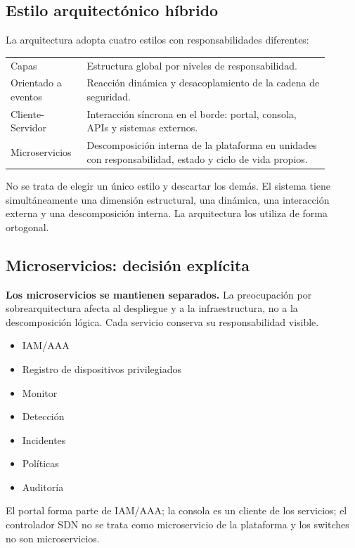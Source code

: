 \documentclass[11pt,a4paper]{article}
\begin{document}
\subsection{Estilo arquitectónico híbrido}

La arquitectura adopta cuatro estilos con responsabilidades diferentes:

\begin{longtable}{p{0.2\linewidth}p{0.7\linewidth}}
\toprule
Capas & Estructura global por niveles de responsabilidad.\\
Orientado a eventos & Reacción dinámica y desacoplamiento de la cadena de seguridad.\\
Cliente-Servidor & Interacción síncrona en el borde: portal, consola, APIs y sistemas externos.\\
Microservicios & Descomposición interna de la plataforma en unidades con responsabilidad, estado y ciclo de vida propios.\\
\bottomrule
\end{longtable}

No se trata de elegir un único estilo y descartar los demás. El sistema tiene simultáneamente una dimensión estructural, una dinámica, una interacción externa y una descomposición interna. La arquitectura los utiliza de forma ortogonal.

\subsection{Microservicios: decisión explícita}

\textbf{Los microservicios se mantienen separados.} La preocupación por sobrearquitectura afecta al despliegue y a la infraestructura, no a la descomposición lógica. Cada servicio conserva su responsabilidad visible.

\begin{itemize}
\item IAM/AAA
\item Registro de dispositivos privilegiados
\item Monitor
\item Detección
\item Incidentes
\item Políticas
\item Auditoría
\end{itemize}

El portal forma parte de IAM/AAA; la consola es un cliente de los servicios; el controlador SDN no se trata como microservicio de la plataforma y los switches no son microservicios.
\end{document}
